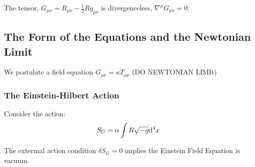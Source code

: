 \documentclass[11pt, a4paper]{article}
\begin{document}
\begin{corollary}
The tensor, $G_{\mu \nu} = R_{\mu \nu} - \tfrac{1}{2} R g_{\mu \nu}$ is divergenceless, $\nabla^\mu G_{\mu \nu} = 0$. 
\end{corollary}

\subsection{The Form of the Equations and the Newtonian Limit}

We postulate a field equation $G_{\mu \nu} = \kappa T_{\mu \nu}$ (DO NEWTONIAN LIMIt)


\subsubsection{The Einstein-Hilbert Action}

Consider the action:
\[ S_G = \alpha \int R \sqrt{-g} \mathrm{d}^{4} x \: \]

\begin{theorem}
The extermal action condition $\delta S_G = 0$ implies the Einstein Field Equation is vacuum.
\end{theorem}
\end{document}
